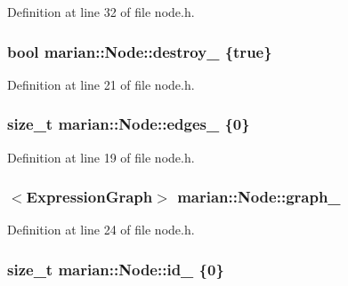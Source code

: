 Definition at line 32 of file node.\+h.

\subsubsection[{\texorpdfstring{destroy\+\_\+}{destroy_}}]{\setlength{\rightskip}{0pt plus 5cm}bool marian\+::\+Node\+::destroy\+\_\+ \{true\}\hspace{0.3cm}{\ttfamily [protected]}}\hypertarget{classmarian_1_1Node_aa83237be30a1afc0f0423b23d534d2d3}{}\label{classmarian_1_1Node_aa83237be30a1afc0f0423b23d534d2d3}


Definition at line 21 of file node.\+h.

\subsubsection[{\texorpdfstring{edges\+\_\+}{edges_}}]{\setlength{\rightskip}{0pt plus 5cm}size\+\_\+t marian\+::\+Node\+::edges\+\_\+ \{0\}\hspace{0.3cm}{\ttfamily [protected]}}\hypertarget{classmarian_1_1Node_aece3097fea8e6ba25623a2c942d50fa8}{}\label{classmarian_1_1Node_aece3097fea8e6ba25623a2c942d50fa8}


Definition at line 19 of file node.\+h.

\subsubsection[{\texorpdfstring{graph\+\_\+}{graph_}}]{$<${\bf Expression\+Graph}$>$ marian\+::\+Node\+::graph\+\_\+\hspace{0.3cm}{\ttfamily [protected]}}\hypertarget{classmarian_1_1Node_ace278ed3e34d2ac833a0a1cf48ae3337}{}\label{classmarian_1_1Node_ace278ed3e34d2ac833a0a1cf48ae3337}


Definition at line 24 of file node.\+h.

\subsubsection[{\texorpdfstring{id\+\_\+}{id_}}]{\setlength{\rightskip}{0pt plus 5cm}size\+\_\+t marian\+::\+Node\+::id\+\_\+ \{0\}\hspace{0.3cm}{\ttfamily [protected]}}\hypertarget{classmarian_1_1Node_aa088753e0e801e0d5cfe8161a1781f3d}{}\label{classmarian_1_1Node_aa088753e0e801e0d5cfe8161a1781f3d}



